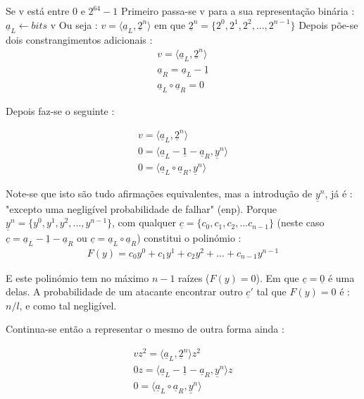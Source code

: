 Se v está entre 0 e $2^{64} - 1$  \newline
Primeiro passa-se v para a sua representação binária :\newline $\underline{a}_L \leftarrow bits$ v \newline
Ou seja : \newline $v = \langle\underline{a}_L, \underline{2}^n\rangle$ \newline
em que $\underline{2}^n = \{2^0, 2^1, 2^2, ..., 2^{n-1}\}$
Depois põe-se dois constrangimentos adicionais :
\begin{align*}
v = \langle\underline{a}_L, \underline{2}^n\rangle\\
\underline{a}_R = \underline{a}_L - \underline{1}\\
\underline{a}_L \circ \underline{a}_R  = 0
\end{align*}

Depois faz-se o seguinte :

\begin{align*}
v = \langle\underline{a}_L, \underline{2}^n\rangle\\
0 = \langle\underline{a}_L - \underline{1} - \underline{a}_R, \underline{y}^n\rangle\\
0 = \langle\underline{a}_L \circ \underline{a}_R, \underline{y}^n\rangle
\end{align*}

Note-se que isto são tudo afirmações equivalentes, mas a introdução de $\underline{y}^n$, já é : "excepto uma negligível probabilidade de falhar" (enp).
Porque $\underline{y}^n = \{y^0, y^1, y^2, ..., y^{n-1}\}$, com qualquer $\underline{c} = \{c_0, c_1, c_2, ...c_{n-1}\}$ (neste caso $\underline{c} = \underline{a}_L - \underline{1} - \underline{a}_R$ ou $\underline{c} = \underline{a}_L \circ \underline{a}_R$) constitui o polinómio : 
\begin{align*}
F(y) = c_0 y^0 + c_1 y^1 + c_2 y^2 + ... + c_{n-1} y^{n-1}   
\end{align*}

E este polinómio tem no máximo $n - 1$ raízes ($F(y) = 0$). Em que $\underline{c} = \underline{0}$ é uma delas. A probabilidade de um atacante encontrar outro $\underline{c}'$ tal que $F(y) = 0$ é : $n/l$, e como tal negligível.\newline

Continua-se então a representar o mesmo de outra forma ainda :

\begin{align*}
vz^2 = \langle\underline{a}_L, \underline{2}^n\rangle z^2\\
0z = \langle\underline{a}_L - \underline{1} - \underline{a}_R, \underline{y}^n\rangle z\\
0 = \langle\underline{a}_L \circ \underline{a}_R, \underline{y}^n\rangle
\end{align*}

